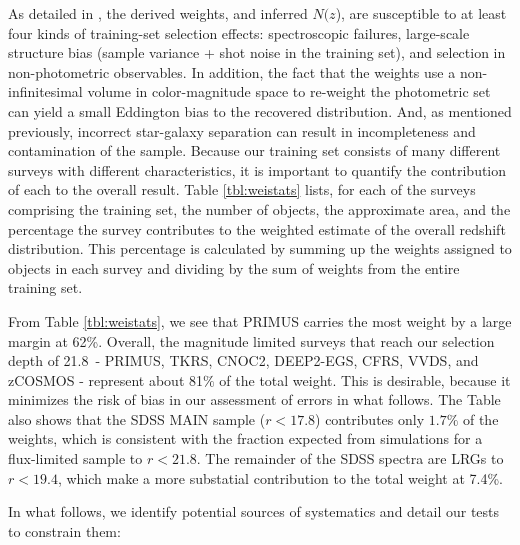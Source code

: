 \documentclass[preprint]{aastex}
\newcommand{\rmax}{21.8}
\newcommand{\nofz}{$N(z$)}
\begin{document}
As detailed in \cite{CunhaPhotoz09}, the derived weights, and inferred \nofz,
are susceptible to at least four kinds of training-set selection effects:
spectroscopic failures, large-scale structure bias (sample variance + shot
noise in the training set), and selection in non-photometric observables.  In
addition, the fact that the weights use a non-infinitesimal volume in color-magnitude
space to re-weight the photometric set can yield a small Eddington bias to the
recovered distribution.  And, as mentioned previously, incorrect star-galaxy
separation can result in incompleteness and contamination of the sample.
Because our training set consists of many different surveys with different
characteristics, it is important to quantify the contribution of each to the
overall result.  Table \ref{tbl:weistats} lists, for each of the surveys
comprising the training set, the number of objects, the approximate area, and
the percentage the survey contributes to the weighted estimate of the overall
redshift distribution.  This percentage is calculated by summing up the weights
assigned to objects in each survey and dividing by the sum of weights from the
entire training set.


From Table \ref{tbl:weistats}, we see that PRIMUS carries the most weight by a
large margin at 62\%.  Overall, the magnitude limited surveys that reach our
selection depth of \rmax\ - PRIMUS, TKRS, CNOC2, DEEP2-EGS, CFRS, VVDS, and
zCOSMOS - represent about 81$\%$ of the total weight.  
This is desirable,
because it minimizes the risk of bias in our assessment of errors in what follows.
The Table also shows that the SDSS MAIN sample ($r<17.8$) contributes only $1.7\%$ of the weights, which
is consistent with the fraction expected from simulations for a flux-limited sample 
to $r<21.8$.
The remainder of the SDSS spectra are LRGs to $r<19.4$, which make a more
substatial contribution to the total weight at 7.4\%.

In what follows, we identify potential sources of systematics and detail our
tests to constrain them:
\end{document}
